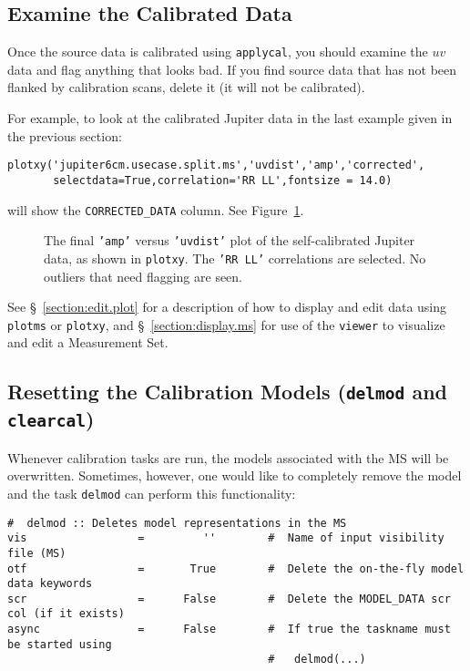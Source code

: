 {%
\subsection{Examine the Calibrated Data}
\label{section:cal.correct.exam}

Once the source data is calibrated using {\tt applycal}, 
you should examine the $uv$ data and flag anything that looks bad.  If
you find source data that has not been flanked by calibration scans,
delete it (it will not be calibrated).  

For example, to look at the calibrated Jupiter data in the last
example given in the previous section:
\small
\begin{verbatim}
plotxy('jupiter6cm.usecase.split.ms','uvdist','amp','corrected',
       selectdata=True,correlation='RR LL',fontsize = 14.0)
\end{verbatim}
\normalsize
will show the {\tt CORRECTED\_DATA} column.  See 
Figure~\ref{fig:applycal_jupiter}.

\begin{figure}[h!]
\begin{center}
\caption{\label{fig:applycal_jupiter} The final {\tt 'amp'} versus
{\tt 'uvdist'} plot of the self-calibrated Jupiter data, as shown
in {\tt plotxy}.  The {\tt 'RR LL'} correlations are selected.
No outliers that need flagging are seen. }
\hrulefill
\end{center}
\end{figure}

See \S~\ref{section:edit.plot} for a description of how to display and edit 
data using {\tt plotms} or {\tt plotxy}, and \S~\ref{section:display.ms} for use of
the {\tt viewer} to visualize and edit a Measurement Set.

\subsection{Resetting the Calibration Models ({\tt delmod} and {\tt clearcal})}
\label{section:cal.correct.clearcal}

Whenever calibration tasks are run, the models associated with the MS
will be overwritten. Sometimes, however, one would like to completely
remove the model and the task {\tt delmod} can perform this
functionality:

\small
\begin{verbatim}
#  delmod :: Deletes model representations in the MS
vis                 =         ''        #  Name of input visibility file (MS)
otf                 =       True        #  Delete the on-the-fly model data keywords
scr                 =      False        #  Delete the MODEL_DATA scr col (if it exists)
async               =      False        #  If true the taskname must be started using
                                        #   delmod(...)
\end{verbatim} 

}
